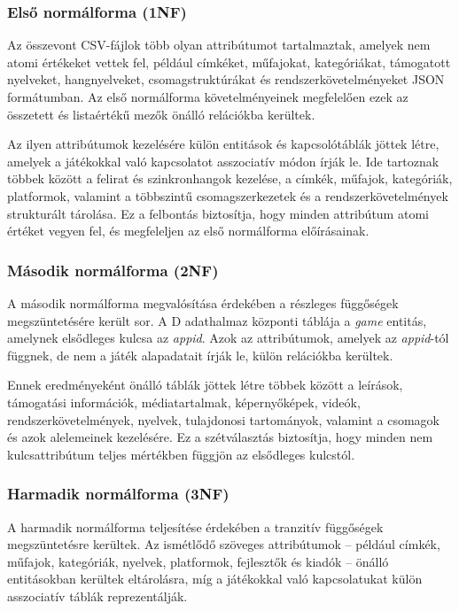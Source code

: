 \subsubsection{Első normálforma (1NF)}

Az összevont CSV-fájlok több olyan attribútumot tartalmaztak, amelyek nem atomi értékeket vettek fel, például címkéket, műfajokat, kategóriákat, támogatott nyelveket, hangnyelveket, csomagstruktúrákat és rendszerkövetelményeket JSON formátumban. Az első normálforma követelményeinek megfelelően ezek az összetett és listaértékű mezők önálló relációkba kerültek.

Az ilyen attribútumok kezelésére külön entitások és kapcsolótáblák jöttek létre, amelyek a játékokkal való kapcsolatot asszociatív módon írják le. Ide tartoznak többek között a felirat és szinkronhangok kezelése, a címkék, műfajok, kategóriák, platformok, valamint a többszintű csomagszerkezetek és a rendszerkövetelmények strukturált tárolása. Ez a felbontás biztosítja, hogy minden attribútum atomi értéket vegyen fel, és megfeleljen az első normálforma előírásainak.

\subsubsection{Második normálforma (2NF)}

A második normálforma megvalósítása érdekében a részleges függőségek megszüntetésére került sor. A D adathalmaz központi táblája a \textit{game} entitás, amelynek elsődleges kulcsa az \textit{appid}. Azok az attribútumok, amelyek az \textit{appid}-tól függnek, de nem a játék alapadatait írják le, külön relációkba kerültek.

Ennek eredményeként önálló táblák jöttek létre többek között a leírások, támogatási információk, médiatartalmak, képernyőképek, videók, rendszerkövetelmények, nyelvek, tulajdonosi tartományok, valamint a csomagok és azok alelemeinek kezelésére. Ez a szétválasztás biztosítja, hogy minden nem kulcsattribútum teljes mértékben függjön az elsődleges kulcstól.

\subsubsection{Harmadik normálforma (3NF)}

A harmadik normálforma teljesítése érdekében a tranzitív függőségek megszüntetésre kerültek. Az ismétlődő szöveges attribútumok – például címkék, műfajok, kategóriák, nyelvek, platformok, fejlesztők és kiadók – önálló entitásokban kerültek eltárolásra, míg a játékokkal való kapcsolatukat külön asszociatív táblák reprezentálják.

